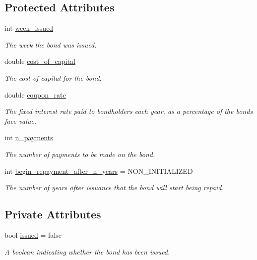 \subsection*{Protected Attributes}
\begin{DoxyCompactItemize}
\item 
int \mbox{\hyperlink{classBond_a30d48d158cbbd9c7b4bfa0012c89590a}{week\+\_\+issued}}
\begin{DoxyCompactList}\small\item\em The week the bond was issued. \end{DoxyCompactList}\item 
double \mbox{\hyperlink{classBond_ad98df7d28b398e620286f95ee085439b}{cost\+\_\+of\+\_\+capital}}
\begin{DoxyCompactList}\small\item\em The cost of capital for the bond. \end{DoxyCompactList}\item 
double \mbox{\hyperlink{classBond_a5f66785534e24caa43d9f730130a6463}{coupon\+\_\+rate}}
\begin{DoxyCompactList}\small\item\em The fixed interest rate paid to bondholders each year, as a percentage of the bond\textquotesingle{}s face value. \end{DoxyCompactList}\item 
int \mbox{\hyperlink{classBond_a4a227b6de2eeada118d82ab1633b1db8}{n\+\_\+payments}}
\begin{DoxyCompactList}\small\item\em The number of payments to be made on the bond. \end{DoxyCompactList}\item 
int \mbox{\hyperlink{classBond_a8d808753f9708e841dfceca72a110737}{begin\+\_\+repayment\+\_\+after\+\_\+n\+\_\+years}} = N\+O\+N\+\_\+\+I\+N\+I\+T\+I\+A\+L\+I\+Z\+ED
\begin{DoxyCompactList}\small\item\em The number of years after issuance that the bond will start being repaid. \end{DoxyCompactList}\end{DoxyCompactItemize}
\subsection*{Private Attributes}
\begin{DoxyCompactItemize}
\item 
bool \mbox{\hyperlink{classBond_adafb5c5d73f072f7139891478a658a10}{issued}} = false
\begin{DoxyCompactList}\small\item\em A boolean indicating whether the bond has been issued. \end{DoxyCompactList}\end{DoxyCompactItemize}


